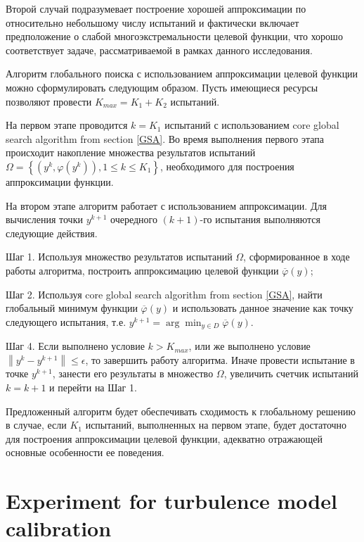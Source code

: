 \documentclass[sensors,article,submit,moreauthors,pdftex]{Definitions/mdpi}
\begin{document}
Второй случай подразумевает построение хорошей аппроксимации по относительно небольшому числу испытаний и фактически включает предположение о слабой многоэкстремальности целевой функции, что хорошо соответствует задаче, рассматриваемой в рамках данного исследования.

Алгоритм глобального поиска с использованием аппроксимации целевой функции можно сформулировать следующим образом. 
Пусть имеющиеся ресурсы позволяют провести $K_{max} = K_1 + K_2$ испытаний. 

На первом этапе проводится $k = K_1$ испытаний с использованием core global search algorithm from section \ref{GSA}.
Во время выполнения первого этапа происходит накопление множества результатов испытаний $\Omega = \left\{(y^k, \varphi(y^k)), 1\leq k\leq K_1\right\}$, необходимого для построения аппроксимации функции.

На втором этапе алгоритм работает с использованием аппроксимации. Для вычисления точки $y^{k+1}$ очередного $(k+1)$-го испытания выполняются следующие действия.

Шаг 1. Используя множество результатов испытаний $\Omega$, сформированное в ходе работы алгоритма, построить аппроксимацию целевой функции $\overline{\varphi}(y)$;

Шаг 2. Используя core global search algorithm from section \ref{GSA}, найти глобальный минимум функции $\overline{\varphi}(y)$ и использовать данное значение как точку следующего испытания, т.е. $y^{k+1} = \arg \min_{y \in D} \overline{\varphi}(y)$.

Шаг 4. Если выполнено условие $k>K_{max}$, или же выполнено условие $\left\|y^k - y^{k+1}\right\| \leq \epsilon$, то завершить работу алгоритма. 
Иначе провести испытание в точке $y^{k+1}$, занести его результаты в множество $\Omega$, увеличить счетчик испытаний $k = k+1$ и перейти на Шаг 1.

Предложенный алгоритм будет обеспечивать сходимость к глобальному решению в случае, если $K_1$ испытаний, выполненных на первом этапе, будет достаточно для построения аппроксимации целевой функции, адекватно отражающей основные особенности ее поведения. 


\section{Experiment for turbulence model calibration}
\end{document}
